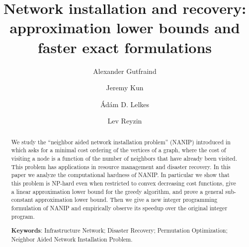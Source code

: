 \documentclass[english]{llncs}
\begin{document}
\title{Network installation and recovery: approximation lower bounds and faster exact formulations}
\date{}

\author{Alexander Gutfraind \and
Jeremy Kun \and
\'Ad\'am D. Lelkes \and
Lev Reyzin}  


\maketitle
 
 
\begin{abstract}
We study the ``neighbor aided network installation problem'' (NANIP) introduced
in~\cite{Gutfraind14} which asks for a minimal cost ordering of the vertices of
a graph, where the cost of visiting a node is a function of the number of
neighbors that have already been visited. This problem has applications in
resource management and disaster recovery. In this paper we analyze the
computational hardness of NANIP. In particular we show that this problem is
NP-hard even when restricted to convex decreasing cost functions, give a
linear approximation lower bound for the greedy algorithm, and prove a  
general sub-constant approximation lower bound. Then we give a new
integer programming formulation of NANIP and empirically observe its speedup
over the original integer program.


\noindent
\textbf{Keywords}: Infrastructure Network; Disaster Recovery; Permutation
Optimization; Neighbor Aided Network Installation Problem.  
\end{abstract}
\end{document}
